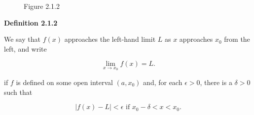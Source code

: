 \begin{flushleft}
\begin{figure}
\begin{picture}
\end{picture}
    \caption{Figure 2.1.2}
    \label{fig:label}
\end{figure}



\textbf{Definition 2.1.2}

 We say that $f(x)$ approaches the left-hand limit $L$ as $x$ approaches $x_0$ from the left,
and write

$$
\lim_{x \rightarrow x_0} f(x) = L.
$$


if $f$ is defined on some open interval $(a,x_0)$ and, for each $\epsilon > 0$, there is a $ \delta > 0$
such that

$$
|f(x) - L| < \epsilon \text{ if }  x_0 - \delta < x < x_0.
$$
\end{flushleft}

